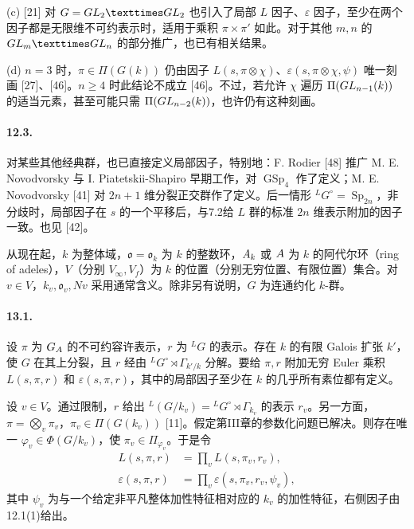 (c) [21] 对 $G=\GL_2\times\GL_2$ 也引入了局部 $L$ 因子、$\varepsilon$ 因子，至少在两个因子都是无限维不可约表示时，适用于乘积 $\pi\times\pi'$ 如此。对于其他 $m,n$ 的 $\GL_m\times\GL_n$ 的部分推广，也已有相关结果。

(d) $n=3$ 时，$\pi\in\Pi(G(k))$ 仍由因子 $L(s,\pi\otimes\chi)$、$\varepsilon(s,\pi\otimes\chi,\psi)$ 唯一刻画 [27]、[46]。$n\geq4$ 时此结论不成立 [46]。不过，若允许 $\chi$ 遍历 $\Pi(GL_{n-1}(k))$ 的适当元素，甚至可能只需 $\Pi(GL_{n-2}(k))$，也许仍有这种刻画。

\paragraph*{12.3.} 对某些其他经典群，也已直接定义局部因子，特别地：F. Rodier [48] 推广 M. E. Novodvorsky 与 I. Piatetskii-Shapiro 早期工作，对 $\operatorname{GSp}_4$ 作了定义；M. E. Novodvorsky [41] 对 $2n+1$ 维分裂正交群作了定义。后一情形 ${}^LG^\circ=\operatorname{Sp}_{2n}$，非分歧时，局部因子在 $s$ 的一个平移后，与7.2给 $L$ 群的标准 $2n$ 维表示附加的因子一致。也见 [42]。

从现在起，$k$ 为整体域，$\mathfrak o=\mathfrak o_k$ 为 $k$ 的整数环，$A_k$ 或 $A$ 为 $k$ 的阿代尔环（ring of adeles），$V$（分别 $V_\infty,V_f$）为 $k$ 的位置（分别无穷位置、有限位置）集合。对 $v\in V$，$k_v,\mathfrak o_v,Nv$ 采用通常含义。除非另有说明，$G$ 为连通约化 $k$-群。

\paragraph*{13.1.} 设 $\pi$ 为 $G_{A}$ 的不可约容许表示，$r$ 为 ${}^LG$ 的表示。存在 $k$ 的有限 Galois 扩张 $k'$，使 $G$ 在其上分裂，且 $r$ 经由 ${}^LG^\circ\rtimes\Gamma_{k'/k}$ 分解。要给 $\pi,r$ 附加无穷 Euler 乘积 $L(s,\pi,r)$ 和 $\varepsilon(s,\pi,r)$，其中的局部因子至少在 $k$ 的几乎所有素位都有定义。

设 $v\in V$。通过限制，$r$ 给出 ${}^L(G/k_v)={}^LG^\circ\rtimes\Gamma_{k_v}$ 的表示 $r_v$。另一方面，$\pi=\bigotimes_v\pi_v$，$\pi_v\in\Pi(G(k_v))$ [11]。假定第III章的参数化问题已解决。则存在唯一 $\varphi_v\in\Phi(G/k_v)$，使 $\pi_v\in\Pi_{\varphi_v}$。于是令
\begin{align}
 L(s,\pi,r)&=\prod_v L(s,\pi_v,r_v),\tag{1}\\
 \varepsilon(s,\pi,r)&=\prod_v\varepsilon(s,\pi_v,r_v,\psi_v),\tag{2}
\end{align}
其中 $\psi_v$ 为与一个给定非平凡整体加性特征相对应的 $k_v$ 的加性特征，右侧因子由12.1(1)给出。

